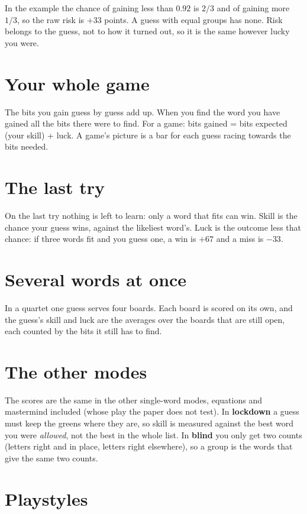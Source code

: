 \documentclass[11pt]{article}
\begin{document}
In the example the chance of gaining less than $0.92$ is $2/3$ and of gaining more $1/3$, so the
raw risk is $+33$ points. A guess with equal groups has none. Risk belongs to the guess, not to
how it turned out, so it is the same however lucky you were.

\section{Your whole game}\label{sec:game}

The bits you gain guess by guess add up. When you find the word you have gained all the bits there
were to find. For a game: bits gained = bits expected (your skill) + luck. A game's picture is a
bar for each guess racing towards the bits needed.

\section{The last try}

On the last try nothing is left to learn: only a word that fits can win. Skill is the chance your
guess wins, against the likeliest word's. Luck is the outcome less that chance: if three words fit
and you guess one, a win is $+67$ and a miss is $-33$.

\section{Several words at once}

In a quartet one guess serves four boards. Each board is scored on its own, and the guess's skill
and luck are the averages over the boards that are still open, each counted by the bits it still
has to find.

\section{The other modes}

The scores are the same in the other single-word modes, equations and mastermind included (whose play the paper does not test). In \textbf{lockdown} a guess must keep
the greens where they are, so skill is measured against the best word you were \emph{allowed},
not the best in the whole list. In \textbf{blind} you only get two counts (letters right and in
place, letters right elsewhere), so a group is the words that give the same two counts.

\section{Playstyles}\label{sec:styles}
\end{document}
